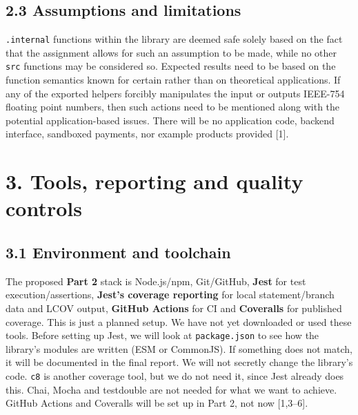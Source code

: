 \documentclass[
  9pt,
]{article}
\begin{document}
\subsection{2.3 Assumptions and
limitations}\label{assumptions-and-limitations}

\texttt{.internal} functions within the library are deemed safe solely
based on the fact that the assignment allows for such an assumption to
be made, while no other \texttt{src} functions may be considered so.
Expected results need to be based on the function semantics known for
certain rather than on theoretical applications. If any of the exported
helpers forcibly manipulates the input or outputs IEEE-754 floating
point numbers, then such actions need to be mentioned along with the
potential application-based issues. There will be no application code,
backend interface, sandboxed payments, nor example products provided
{[}1{]}.

\section{3. Tools, reporting and quality
controls}\label{tools-reporting-and-quality-controls}

\subsection{3.1 Environment and
toolchain}\label{environment-and-toolchain}

The proposed \textbf{Part 2} stack is Node.js/npm, Git/GitHub,
\textbf{Jest} for test execution/assertions, \textbf{Jest's coverage
reporting} for local statement/branch data and LCOV output,
\textbf{GitHub Actions} for CI and \textbf{Coveralls} for published
coverage. This is just a planned setup. We have not yet downloaded or
used these tools. Before setting up Jest, we will look at
\texttt{package.json} to see how the library's modules are written (ESM
or CommonJS). If something does not match, it will be documented in the
final report. We will not secretly change the library's code.
\texttt{c8} is another coverage tool, but we do not need it, since Jest
already does this. Chai, Mocha and testdouble are not needed for what we
want to achieve. GitHub Actions and Coveralls will be set up in Part 2,
not now {[}1,3--6{]}.
\end{document}
